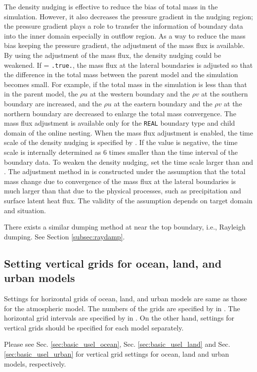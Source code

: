 The density nudging is effective to reduce the bias of total mass in the simulation. However, it also decreases the pressure gradient in the nudging region; the pressure gradient plays a role to transfer the information of boundary data into the inner domain especially in outflow region.
As a way to reduce the mass bias keeping the pressure gradient, the adjustment of the mass flux is available.
By using the adjustment of the mass flux, the density nudging could be weakened.
%
If  = \verb|.true.|,
the mass flux at the lateral boundaries is adjusted so that the difference in the total mass between the parent model and the simulation becomes small.
For example, if the total mass in the simulation is less than that in the parent model, the $\rho u$ at the western boundary and the $\rho v$ at the southern boundary are increased, and the $\rho u$ at the eastern boundary and the $\rho v$ at the northern boundary are decreased to enlarge the total mass convergence.
The mass flux adjustment is available only for the \verb|REAL| boundary type and child domain of the online nesting.
When the mass flux adjustment is enabled, the time scale of the density nudging is specified by .
If the value is negative, the time scale is internally determined as 6 times smaller than the time interval of the boundary data.
To weaken the density nudging, set the time scale larger than  and .
The adjustment method in \scalerm is constructed under the assumption that the total mass change due to convergence of the mass flux at the lateral boundaries is much larger than that due to the physical processes, such as precipitation and surface latent heat flux.
The validity of the assumption depends on target domain and situation.

There exists a similar dumping method at near the top boundary, i.e., Rayleigh dumping. See Section \ref{subsec:raydamp}.

\subsection{Setting vertical grids for ocean, land, and urban models} \label{subsec:gridolu}

Settings for horizontal grids of ocean, land, and urban models are same as those for the atmospheric model.
The numbers of the grids are specified by  in .
The horizontal grid intervals are specified by  in .
On the other hand, settings for vertical grids should be specified for each model separately.

Please see Sec. \ref{sec:basic_usel_ocean}, Sec. \ref{sec:basic_usel_land} and Sec. \ref{sec:basic_usel_urban}
for vertical grid settings for ocean, land and urban models, respectively.
